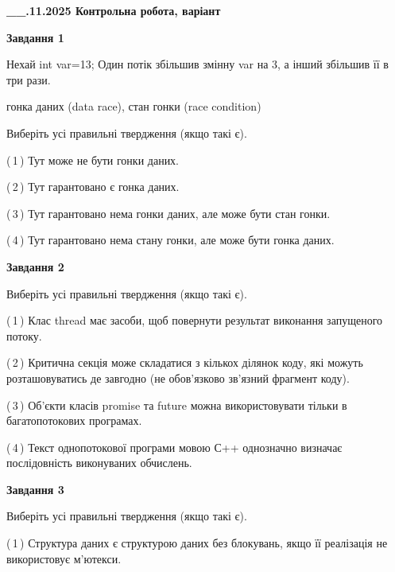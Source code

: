 \documentclass[12pt, ukrainian]{article}
\begin{document}
\begin {large}

\textbf{\_\_.11.2025 Контрольна робота, варіант  }\par


{

\begin{center}
\textbf{Завдання 1}
\end{center}
Нехай int var=13; Один потік збільшив змінну var на 3, а інший збільшив її в три рази.

гонка даних (data race), стан гонки (race condition)

Виберіть усі правильні твердження (якщо такі є).\par
\vspace{2mm}
(\,1\,) Тут може не бути гонки даних.%

(\,2\,) Тут гарантовано є гонка даних.%

(\,3\,) Тут гарантовано нема гонки даних, але може бути стан гонки.%

(\,4\,) Тут гарантовано нема стану гонки, але може бути гонка даних.%



\begin{center}
\textbf{Завдання 2}
\end{center}
Виберіть усі правильні твердження (якщо такі є).\par
\vspace{2mm}

(\,1\,) Клас thread має засоби, щоб повернути результат виконання запущеного потоку.%

(\,2\,) Критична секція може складатися з кількох ділянок коду, які можуть розташовуватись де завгодно (не обов’язково зв’язний фрагмент коду).%

(\,3\,) Об’єкти класів promise та future можна використовувати тільки в багатопотокових програмах.%

(\,4\,) Текст однопотокової програми мовою С++ однозначно визначає послідовність виконуваних обчислень.%



\begin{center}
\textbf{Завдання 3}
\end{center}
Виберіть усі правильні твердження (якщо такі є).\par


(\,1\,) Структура даних є структурою даних без блокувань, якщо її реалізація не використовує м’ютекси.%

}
\end{large}
\end{document}
